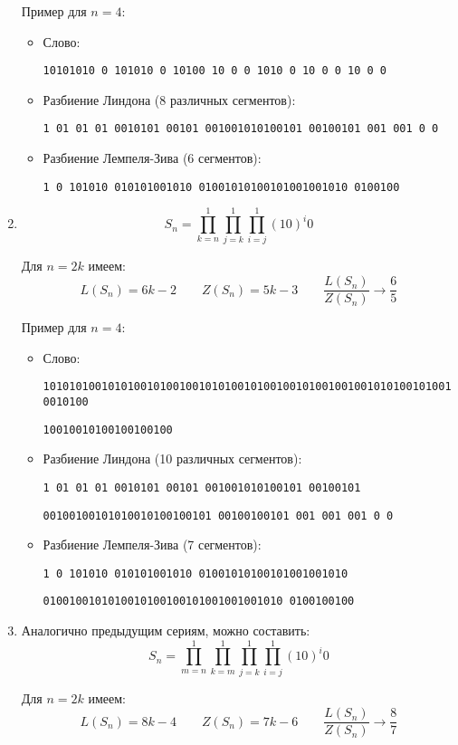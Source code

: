 \documentclass[a4paper]{article}
\begin{document}
\begin{enumerate}
    Пример для $ n = 4 $:
    
    \begin{itemize}
    \item
        Слово:
        
        \texttt{10101010 0 101010 0 10100 10 0  0 1010 0 10 0  0 10 0  0}
    \item
        Разбиение Линдона (8 различных сегментов):
        
        \texttt{1 01 01 01 0010101 00101 001001010100101 00100101 001 001 0 0}
    \item
        Разбиение Лемпеля-Зива (6 сегментов):
        
        \texttt{1 0 101010 010101001010 01001010100101001001010 0100100}
    \end{itemize}

\item
    $$ S_n = \prod_{k = n}^{1} \prod_{j = k}^{1} \prod_{i = j}^{1} (10)^i 0 $$
    
    Для $ n = 2 k $ имеем:
    $$ L(S_n) = 6 k - 2 \qquad Z(S_n) = 5 k - 3 \qquad \frac{L(S_n)}{Z(S_n)} \to \frac{6}{5} $$
    
    Пример для $ n = 4 $:
    
    \begin{itemize}
    \item
        Слово:
        
        \texttt{1010101001010100101001001010100101001001010010010010101001010010010100}
        
        \texttt{10010010100100100100}
    \item
        Разбиение Линдона (10 различных сегментов):
        
        \texttt{1 01 01 01 0010101 00101 001001010100101 00100101}
        
        \texttt{00100100101010010100100101 00100100101 001 001 001 0 0}
    \item
        Разбиение Лемпеля-Зива (7 сегментов):
        
        \texttt{1 0 101010 010101001010 01001010100101001001010}
        
        \texttt{0100100101010010100100101001001001010 0100100100}
    \end{itemize}
    
\item
    Аналогично предыдущим сериям, можно составить:
    $$ S_n = \prod_{m = n}^{1} \prod_{k = m}^{1} \prod_{j = k}^{1} \prod_{i = j}^{1} (10)^i 0 $$
    
    Для $ n = 2 k $ имеем:
    $$ L(S_n) = 8 k - 4 \qquad Z(S_n) = 7 k - 6 \qquad \frac{L(S_n)}{Z(S_n)} \to \frac{8}{7} $$

\end{enumerate}
\end{document}

